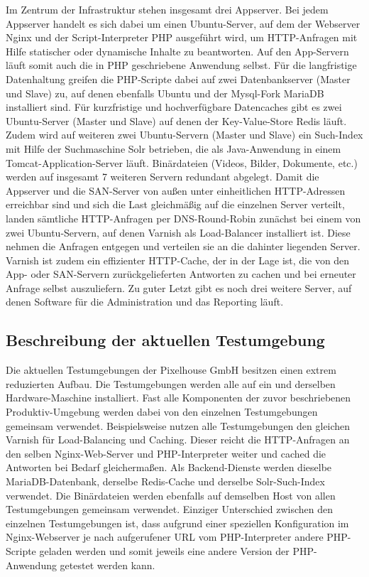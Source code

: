 Im Zentrum der Infrastruktur stehen insgesamt drei Appserver. Bei jedem Appserver handelt es sich dabei um einen Ubuntu-Server, auf dem der Webserver Nginx und der Script-Interpreter PHP ausgeführt wird, um HTTP-Anfragen mit Hilfe statischer oder dynamische Inhalte zu beantworten. Auf den App-Servern läuft somit auch die in PHP geschriebene Anwendung selbst. Für die langfristige Datenhaltung greifen die PHP-Scripte dabei auf zwei Datenbankserver (Master und Slave) zu, auf denen ebenfalls Ubuntu und der Mysql-Fork MariaDB installiert sind. Für kurzfristige und hochverfügbare Datencaches gibt es zwei Ubuntu-Server (Master und Slave) auf denen der Key-Value-Store Redis läuft. Zudem wird auf weiteren zwei Ubuntu-Servern (Master und Slave) ein Such-Index mit Hilfe der Suchmaschine Solr betrieben, die als Java-Anwendung in einem Tomcat-Application-Server läuft. Binärdateien (Videos, Bilder, Dokumente, etc.) werden auf insgesamt 7 weiteren Servern redundant abgelegt. Damit die Appserver und die SAN-Server von außen unter einheitlichen HTTP-Adressen erreichbar sind und sich die Last gleichmäßig auf die einzelnen Server verteilt, landen sämtliche HTTP-Anfragen per DNS-Round-Robin zunächst bei einem von zwei Ubuntu-Servern, auf denen Varnish als Load-Balancer installiert ist. Diese nehmen die Anfragen entgegen und verteilen sie an die dahinter liegenden Server. Varnish ist zudem ein effizienter HTTP-Cache, der in der Lage ist, die von den App- oder SAN-Servern zurückgelieferten Antworten zu cachen und bei erneuter Anfrage selbst auszuliefern. Zu guter Letzt gibt es noch drei weitere Server, auf denen Software für die Administration und das Reporting läuft.

\subsection{Beschreibung der aktuellen Testumgebung}

Die aktuellen Testumgebungen der Pixelhouse GmbH besitzen einen extrem reduzierten Aufbau. Die Testumgebungen werden alle auf ein und derselben Hardware-Maschine installiert. Fast alle Komponenten der zuvor beschriebenen Produktiv-Umgebung werden dabei von den einzelnen Testumgebungen gemeinsam verwendet. Beispielsweise nutzen alle Testumgebungen den gleichen Varnish für Load-Balancing und Caching. Dieser reicht die HTTP-Anfragen an den selben Nginx-Web-Server und PHP-Interpreter weiter und cached die Antworten bei Bedarf gleichermaßen. Als Backend-Dienste werden dieselbe MariaDB-Datenbank, derselbe Redis-Cache und derselbe Solr-Such-Index verwendet. Die Binärdateien werden ebenfalls auf demselben Host von allen Testumgebungen gemeinsam verwendet. Einziger Unterschied zwischen den einzelnen Testumgebungen ist, dass aufgrund einer speziellen Konfiguration im Nginx-Webserver je nach aufgerufener URL vom PHP-Interpreter andere PHP-Scripte geladen werden und somit jeweils eine andere Version der PHP-Anwendung getestet werden kann.

